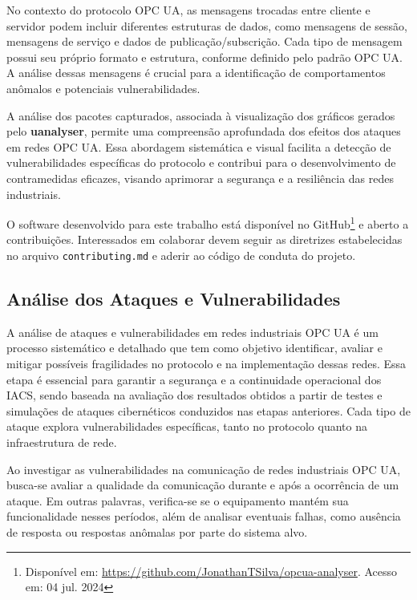         No contexto do protocolo OPC UA, as mensagens trocadas entre cliente e servidor podem incluir diferentes estruturas de dados, como mensagens de sessão, mensagens de serviço e dados de publicação/subscrição. Cada tipo de mensagem possui seu próprio formato e estrutura, conforme definido pelo padrão OPC UA. A análise dessas mensagens é crucial para a identificação de comportamentos anômalos e potenciais vulnerabilidades.

        A análise dos pacotes capturados, associada à visualização dos gráficos gerados pelo \textbf{uanalyser}, permite uma compreensão aprofundada dos efeitos dos ataques em redes OPC UA. Essa abordagem sistemática e visual facilita a detecção de vulnerabilidades específicas do protocolo e contribui para o desenvolvimento de contramedidas eficazes, visando aprimorar a segurança e a resiliência das redes industriais.

        O software desenvolvido para este trabalho está disponível no GitHub\footnote{Disponível em: \url{https://github.com/JonathanTSilva/opcua-analyser}. Acesso em: 04 jul. 2024} e aberto a contribuições. Interessados em colaborar devem seguir as diretrizes estabelecidas no arquivo \texttt{contributing.md} e aderir ao código de conduta do projeto.


    \subsection{Análise dos Ataques e Vulnerabilidades}

        A análise de ataques e vulnerabilidades em redes industriais OPC UA é um processo sistemático e detalhado que tem como objetivo identificar, avaliar e mitigar possíveis fragilidades no protocolo e na implementação dessas redes. Essa etapa é essencial para garantir a segurança e a continuidade operacional dos IACS, sendo baseada na avaliação dos resultados obtidos a partir de testes e simulações de ataques cibernéticos conduzidos nas etapas anteriores. Cada tipo de ataque explora vulnerabilidades específicas, tanto no protocolo quanto na infraestrutura de rede.

        Ao investigar as vulnerabilidades na comunicação de redes industriais OPC UA, busca-se avaliar a qualidade da comunicação durante e após a ocorrência de um ataque. Em outras palavras, verifica-se se o equipamento mantém sua funcionalidade nesses períodos, além de analisar eventuais falhas, como ausência de resposta ou respostas anômalas por parte do sistema alvo.
        
